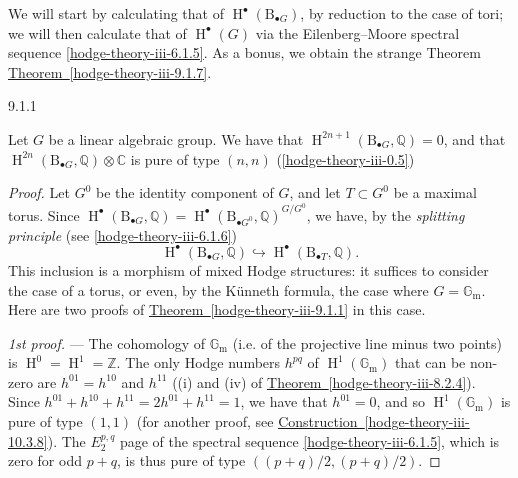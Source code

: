   We will start by calculating that of \(\operatorname {H}^\bullet (\mathrm {B}_{\bullet  G})\), by reduction to the case of tori;
  we will then calculate that of \(\operatorname {H}^\bullet (G)\) via the Eilenberg–Moore spectral sequence \cref{hodge-theory-iii-6.1.5}.
  As a bonus, we obtain the strange Theorem \hyperref[hodge-theory-iii-9.1.7]{Theorem~\ref*{hodge-theory-iii-9.1.7}}.\begin{theorem}{9.1.1}\label{hodge-theory-iii-9.1.1}\skipsinglepar\par{}Let \(G\) be a linear algebraic group.
    We have that \(\operatorname {H}^{2n+1}(\mathrm {B}_{\bullet  G},\mathbb {Q})=0\), and that \(\operatorname {H}^{2n}(\mathrm {B}_{\bullet  G},\mathbb {Q})\otimes \mathbb {C}\) is pure of type \((n,n)\) (\cref{hodge-theory-iii-0.5})\begin{proof}\par{}Let \(G^0\) be the identity component of \(G\), and let \(T\subset  G^0\) be a maximal torus.
      Since \(\operatorname {H}^\bullet (\mathrm {B}_{\bullet  G},\mathbb {Q})=\operatorname {H}^\bullet (\mathrm {B}_{\bullet  G^0},\mathbb {Q})^{G/G^0}\), we have, by the \emph{splitting principle} (see \cref{hodge-theory-iii-6.1.6})
      \[         \operatorname {H}^\bullet (\mathrm {B}_{\bullet  G},\mathbb {Q})         \hookrightarrow  \operatorname {H}^\bullet (\mathrm {B}_{\bullet  T},\mathbb {Q}).       \]
      This inclusion is a morphism of mixed Hodge structures: it suffices to consider the case of a torus, or even, by the Künneth formula, the case where \(G=\mathbb {G}_\mathrm {m}\).
      Here are two proofs of \hyperref[hodge-theory-iii-9.1.1]{Theorem~\ref*{hodge-theory-iii-9.1.1}} in this case.\par{}\emph{1st proof.} —
      The cohomology of \(\mathbb {G}_\mathrm {m}\) (i.e. of the projective line minus two points) is \(\operatorname {H}^0=\operatorname {H}^1=\mathbb {Z}\).
      The only Hodge numbers \(h^{pq}\) of \(\operatorname {H}^1(\mathbb {G}_\mathrm {m})\) that can be non-zero are \(h^{01}=h^{10}\) and \(h^{11}\) ((i) and (iv) of \hyperref[hodge-theory-iii-8.2.4]{Theorem~\ref*{hodge-theory-iii-8.2.4}}).
      Since \(h^{01}+h^{10}+h^{11}=2h^{01}+h^{11}=1\), we have that \(h^{01}=0\), and so \(\operatorname {H}^1(\mathbb {G}_\mathrm {m})\) is pure of type \((1,1)\) (for another proof, see \hyperref[hodge-theory-iii-10.3.8]{Construction~\ref*{hodge-theory-iii-10.3.8}}).
      The \(E_2^{p,q}\) page of the spectral sequence \cref{hodge-theory-iii-6.1.5}, which is zero for odd \(p+q\), is thus pure of type \(((p+q)/2,(p+q)/2)\).

\end{proof}
\end{theorem}
